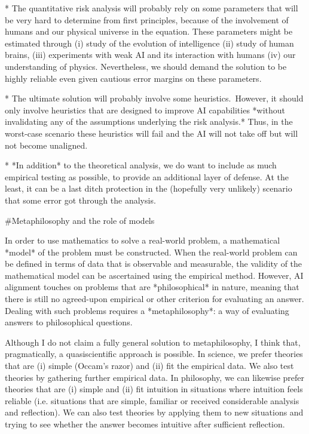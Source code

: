 \documentclass[a4paper]{article}
\begin{document}
* The quantitative risk analysis will probably rely on some parameters that will be very hard to determine from first principles, because of the involvement of humans and our physical universe in the equation. These parameters might be estimated through (i) study of the evolution of intelligence (ii) study of human brains, (iii) experiments with weak AI and its interaction with humans (iv) our understanding of physics. Nevertheless, we should demand the solution to be highly reliable even given cautious error margins on these parameters.

* The ultimate solution will probably involve some heuristics.\ However, it should only involve heuristics that are designed to improve AI capabilities *without invalidating any of the assumptions underlying the risk analysis.* Thus, in the worst-case scenario these heuristics will fail and the AI will not take off but will not become unaligned.

* *In addition* to the theoretical analysis, we do want to include as much empirical testing as possible, to provide an additional layer of defense. At the least, it can be a last ditch protection in the (hopefully very unlikely) scenario that some error got through the analysis.

\#Metaphilosophy and the role of models

In order to use mathematics to solve a real-world problem, a mathematical *model* of the problem must be constructed. When the real-world problem can be defined in terms of data that is observable and measurable, the validity of the mathematical model can be ascertained using the empirical method. However, AI alignment touches on problems that are *philosophical* in nature, meaning that there is still no agreed-upon empirical or other criterion for evaluating an answer. Dealing with such problems requires a *metaphilosophy*: a way of evaluating answers to philosophical questions.

Although I do not claim a fully general solution to metaphilosophy, I think that, pragmatically, a quasiscientific approach is possible. In science, we prefer theories that are (i) simple (Occam's razor) and (ii) fit the empirical data. We also test theories by gathering further empirical data. In philosophy, we can likewise prefer theories that are (i) simple and (ii) fit intuition in situations where intuition feels reliable (i.e. situations that are simple, familiar or received considerable analysis and reflection). We can also test theories by applying them to new situations and trying to see whether the answer becomes intuitive after sufficient reflection.
\end{document}
